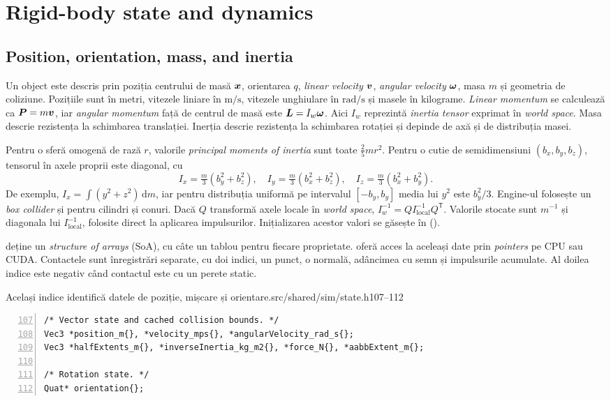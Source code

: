 \documentclass[11pt,a4paper]{article}
\begin{document}
\section{Rigid-body state and dynamics}

\subsection{Position, orientation, mass, and inertia}

Un object este descris prin poziția centrului de masă \(\boldsymbol{x}\),
orientarea \(q\), \emph{linear velocity} \(\boldsymbol{v}\), \emph{angular velocity}
\(\boldsymbol{\omega}\), masa \(m\) și geometria de coliziune. Pozițiile sunt
în metri, vitezele liniare în \(\mathrm{m/s}\), vitezele unghiulare în
\(\mathrm{rad/s}\) și masele în kilograme. \emph{Linear momentum}
se calculează ca \(\boldsymbol{P}=m\boldsymbol{v}\), iar \emph{angular momentum}
față de centrul de masă este \(\boldsymbol{L}=I_w\boldsymbol{\omega}\).
Aici \(I_w\) reprezintă \emph{inertia tensor} exprimat în
\emph{world space}. Masa descrie rezistența la schimbarea
translației. Inerția descrie rezistența la schimbarea rotației și
depinde de axă și de distribuția masei.

Pentru o sferă omogenă de rază \(r\), valorile \emph{principal moments of inertia} sunt toate
\(\tfrac25mr^2\). Pentru o cutie de semidimensiuni
\((b_x,b_y,b_z)\), tensorul în axele proprii este diagonal, cu
\begin{equation}
  I_x=\tfrac m3(b_y^2+b_z^2),\quad
  I_y=\tfrac m3(b_x^2+b_z^2),\quad
  I_z=\tfrac m3(b_x^2+b_y^2).
\end{equation}
De exemplu, \(I_x=\int(y^2+z^2)\,\mathrm{d}m\), iar pentru distribuția
uniformă pe intervalul \([-b_y,b_y]\) media lui \(y^2\) este
\(b_y^2/3\). Engine-ul folosește un \emph{box collider} și pentru
cilindri și conuri. Dacă \(Q\) transformă axele locale în \emph{world space},
\(I_w^{-1}=Q I_{\mathrm{local}}^{-1} Q^\mathsf T\). Valorile stocate
sunt \(m^{-1}\) și diagonala lui \(I_{\mathrm{local}}^{-1}\),
folosite direct la aplicarea impulsurilor.
Inițializarea acestor valori se găsește în 
().

 deține un \emph{structure of arrays} (SoA), cu câte un tablou pentru fiecare proprietate.
 oferă acces la aceleași date prin \emph{pointers}
pe CPU sau CUDA.
Contactele sunt înregistrări separate, cu doi indici, un punct,
o normală, adâncimea cu semn și impulsurile acumulate. Al doilea
indice este negativ când contactul este cu un perete static.
\begin{codefragment}{Același indice identifică datele de poziție, mișcare și orientare.}{src/shared/sim/state.h}{107--112}
\begin{lstlisting}[numbers=left,firstnumber=107]
/* Vector state and cached collision bounds. */
Vec3 *position_m{}, *velocity_mps{}, *angularVelocity_rad_s{};
Vec3 *halfExtents_m{}, *inverseInertia_kg_m2{}, *force_N{}, *aabbExtent_m{};

/* Rotation state. */
Quat* orientation{};
\end{lstlisting}
\end{codefragment}
\end{document}
